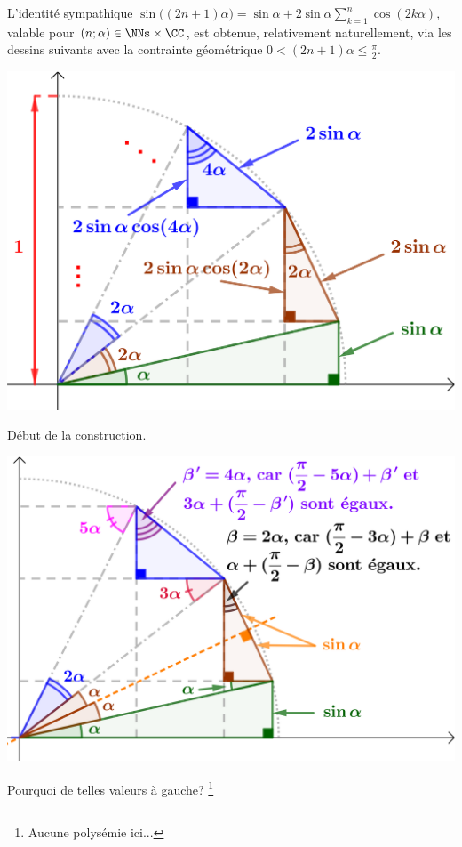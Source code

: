 \begin{example}
    L'identité sympathique
    $ \sin \big( (2n+1) \alpha \big)
    = \sin \alpha
    + 2 \sin \alpha \sum_{k=1}^{n} \cos ( 2k \alpha )$,
    valable pour $(n ; \alpha) \in \NNs \times \CC$,
    est obtenue, relativement naturellement, via les dessins suivants avec la contrainte géométrique $0 < (2n +1) \alpha \leq \frac{\pi}{2}$.
	
	
	\begin{multicols}{2}
	\small\itshape
	\begin{center}
		\includegraphics[scale=.75]{tricky-trigo-sum.png}
		
		\smallskip
		Début de la construction.

		\includegraphics[scale=.75]{tricky-trigo-sum-why.png}
		
		\smallskip
		Pourquoi de telles valeurs à gauche?%
		\footnote{
		    Aucune polysémie ici...
		}
	\end{center}
	\end{multicols}
\end{example}
